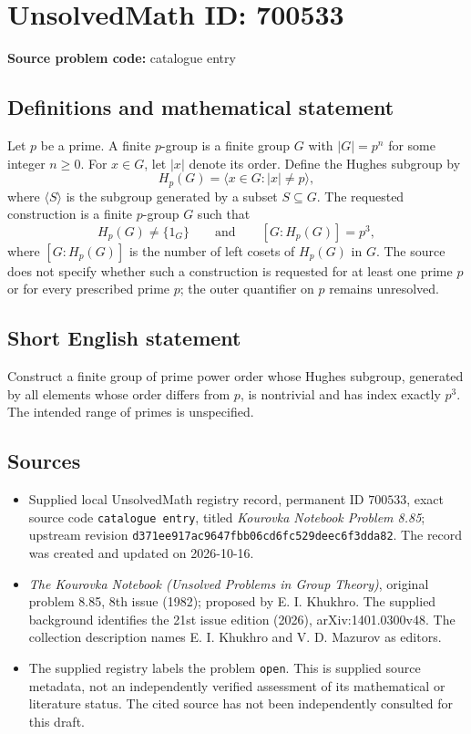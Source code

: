 \documentclass[11pt]{article}
\begin{document}
\section*{UnsolvedMath ID: 700533}
\textbf{Source problem code:} catalogue entry
\subsection{Definitions and mathematical statement}
Let \(p\) be a prime. A finite \(p\)-group is a finite group \(G\) with \(|G|=p^n\) for some integer \(n\geq 0\). For \(x\in G\), let \(|x|\) denote its order. Define the Hughes subgroup by
\[
H_p(G)=\bigl\langle x\in G : |x|\neq p\bigr\rangle,
\]
where \(\langle S\rangle\) is the subgroup generated by a subset \(S\subseteq G\).
The requested construction is a finite \(p\)-group \(G\) such that
\[
H_p(G)\neq\{1_G\}
\qquad\text{and}\qquad
[G:H_p(G)]=p^3,
\]
where \([G:H_p(G)]\) is the number of left cosets of \(H_p(G)\) in \(G\).
The source does not specify whether such a construction is requested for at least one prime \(p\) or for every prescribed prime \(p\); the outer quantifier on \(p\) remains unresolved.
\subsection{Short English statement}
Construct a finite group of prime power order whose Hughes subgroup, generated by all elements whose order differs from \(p\), is nontrivial and has index exactly \(p^3\). The intended range of primes is unspecified.
\subsection{Sources}
\begin{itemize}
\item Supplied local UnsolvedMath registry record, permanent ID \(700533\), exact source code \texttt{catalogue entry}, titled \emph{Kourovka Notebook Problem 8.85}; upstream revision \texttt{d371ee917ac9647fbb06cd6fc529deec6f3dda82}. The record was created and updated on 2026-10-16.
\item \emph{The Kourovka Notebook (Unsolved Problems in Group Theory)}, original problem 8.85, 8th issue (1982); proposed by E. I. Khukhro. The supplied background identifies the 21st issue edition (2026), arXiv:1401.0300v48. The collection description names E. I. Khukhro and V. D. Mazurov as editors.
\item The supplied registry labels the problem \texttt{open}. This is supplied source metadata, not an independently verified assessment of its mathematical or literature status. The cited source has not been independently consulted for this draft.
\end{itemize}
\end{document}
